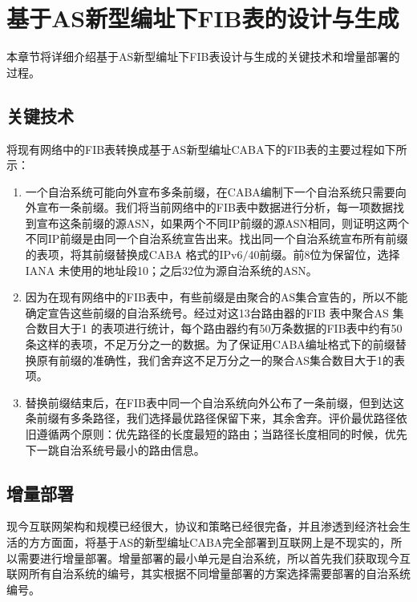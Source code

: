 \section{基于AS新型编址下FIB表的设计与生成}
本章节将详细介绍基于AS新型编址下FIB表设计与生成的关键技术和增量部署的过程。
\subsection{关键技术}
将现有网络中的FIB表转换成基于AS新型编址CABA下的FIB表的主要过程如下所示：
\begin{enumerate}
\item 一个自治系统可能向外宣布多条前缀，在CABA编制下一个自治系统只需要向外宣布一条前缀。我们将当前网络中的FIB表中数据进行分析，每一项数据找到宣布这条前缀的源ASN，如果两个不同IP前缀的源ASN相同，则证明这两个不同IP前缀是由同一个自治系统宣告出来。找出同一个自治系统宣布所有前缀的表项，将其前缀替换成CABA 格式的IPv6$/$40前缀。前8位为保留位，选择IANA 未使用的地址段10；之后32位为源自治系统的ASN。
\item 因为在现有网络中的FIB表中，有些前缀是由聚合的AS集合宣告的，所以不能确定宣告这些前缀的自治系统号。经过对这13台路由器的FIB 表中聚合AS 集合数目大于1 的表项进行统计，每个路由器约有50万条数据的FIB表中约有50条这样的表项，不足万分之一的数据。为了保证用CABA编址格式下的前缀替换原有前缀的准确性，我们舍弃这不足万分之一的聚合AS集合数目大于1的表项。
\item 替换前缀结束后，在FIB表中同一个自治系统向外公布了一条前缀，但到达这条前缀有多条路径，我们选择最优路径保留下来，其余舍弃。评价最优路径依旧遵循两个原则：优先路径的长度最短的路由；当路径长度相同的时候，优先下一跳自治系统号最小的路由信息。
\end{enumerate}

\subsection{增量部署}
现今互联网架构和规模已经很大，协议和策略已经很完备，并且渗透到经济社会生活的方方面面，将基于AS的新型编址CABA完全部署到互联网上是不现实的，所以需要进行增量部署。增量部署的最小单元是自治系统，所以首先我们获取现今互联网所有自治系统的编号，其实根据不同增量部署的方案选择需要部署的自治系统编号。

